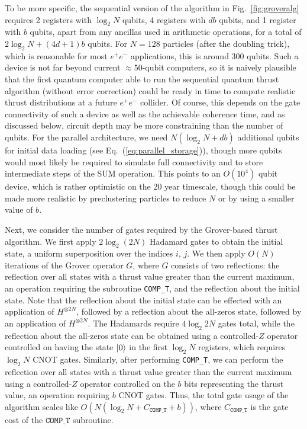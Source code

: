 \documentclass[aps,prd,twocolumn,superscriptaddress,preprintnumbers,nofootinbib,longbibliography,floatfix]{revtex4-1}
\DeclareRobustCommand{\Fig}[1]{Fig.~\ref{#1}}
\DeclareRobustCommand{\Eq}[1]{Eq.~(\ref{#1})}
\begin{document}
To be more specific, the sequential version of the algorithm in \Fig{fig:groveralg} requires 2 registers with $\log_2 N$ qubits, 4 registers with $d b$ qubits, and 1 register with $b$ qubits, apart from any ancillas used in arithmetic operations, for a total of $2\log_2 N + (4d+1)b$ qubits.
%
For $N = 128$ particles (after the doubling trick), which is reasonable for most $e^+e^-$ applications, this is around 300 qubits.
%
Such a device is not far beyond current $\approx 50$-qubit computers, so it is naively plausible that the first quantum computer able to run the sequential quantum thrust algorithm (without error correction) could be ready in time to compute realistic thrust distributions at a future $e^+e^-$ collider.
%
Of course, this depends on the gate connectivity of such a device as well as the achievable coherence time, and as discussed below, circuit depth may be more constraining than the number of qubits.
%
For the parallel architecture, we need $N (\log_2 N + d b)$ additional qubits for initial data loading (see \Eq{eq:parallel_storage}), though more qubits would most likely be required to simulate full connectivity and to store intermediate steps of the SUM operation.
%
This points to an $O(10^4)$ qubit device, which is rather optimistic on the 20 year timescale, though this could be made more realistic by preclustering particles to reduce $N$ or by using a smaller value of $b$.


Next, we consider the number of gates required by the Grover-based thrust algorithm.
%
We first apply $2\log_2 (2N)$ Hadamard gates to obtain the initial state, a uniform superposition over the indices $i$, $j$.
%
We then apply $O(N)$ iterations of the Grover operator $G$, where $G$ consists of two reflections: the reflection over all states with a thrust value greater than the current maximum, an operation requiring the subroutine \texttt{COMP\_T}, and the reflection about the initial state.
%
Note that the reflection about the initial state can be effected with an application of $H^{\otimes 2N}$, followed by a reflection about the all-zeros state, followed by an application of $H^{\otimes 2N}$.
%
The Hadamards require $4\log_2 2N$ gates total, while the reflection about the all-zeros state can be obtained using a controlled-$Z$ operator controlled on having the state $\ket{0}$ in the first $\log_2 N$ registers, which requires $\log_2 N$ CNOT gates.
%
Similarly, after performing \texttt{COMP\_T}, we can perform the reflection over all states with a thrust value greater than the current maximum using a controlled-$Z$ operator controlled on the $b$ bits representing the thrust value, an operation requiring $b$ CNOT gates.
%
Thus, the total gate usage of the algorithm scales like $O(N(\log_2 N+C_{\texttt{COMP\_T}}+b))$, where $C_{\texttt{COMP\_T}}$ is the gate cost of the $\texttt{COMP\_T}$ subroutine.
\end{document}
